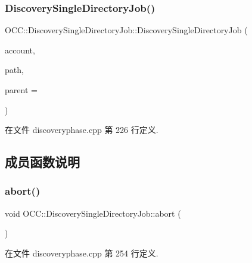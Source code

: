 \subsubsection{\texorpdfstring{Discovery\+Single\+Directory\+Job()}{DiscoverySingleDirectoryJob()}}
{\footnotesize\ttfamily O\+C\+C\+::\+Discovery\+Single\+Directory\+Job\+::\+Discovery\+Single\+Directory\+Job (\begin{DoxyParamCaption}\item[{const \hyperlink{namespace_o_c_c_a848616aedb9188e223c6b9867757fe69}{Account\+Ptr} \&}]{account,  }\item[{const Q\+String \&}]{path,  }\item[{Q\+Object $\ast$}]{parent = {} }\end{DoxyParamCaption})\hspace{0.3cm}{\ttfamily [explicit]}}



在文件 discoveryphase.\+cpp 第 226 行定义.



\subsection{成员函数说明}
\mbox{\label{class_o_c_c_1_1_discovery_single_directory_job_ac3067dbaea04e836957f171f9ae00582}} 
\subsubsection{\texorpdfstring{abort()}{abort()}}
{\footnotesize\ttfamily void O\+C\+C\+::\+Discovery\+Single\+Directory\+Job\+::abort (\begin{DoxyParamCaption}{ }\end{DoxyParamCaption})}



在文件 discoveryphase.\+cpp 第 254 行定义.

\mbox{\label{class_o_c_c_1_1_discovery_single_directory_job_a28b023e735b657d9d2f91f147767a823}} 
